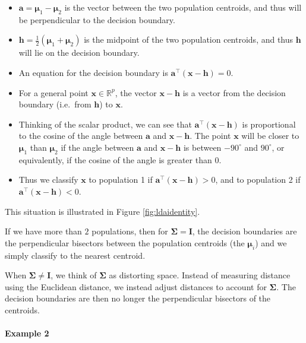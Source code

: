 \documentclass[
]{book}
\theoremstyle{definition}
\theoremstyle{definition}
\theoremstyle{definition}
\theoremstyle{definition}
\theoremstyle{remark}
\begin{document}
\begin{itemize}
\item
  \(\mathbf a= {\boldsymbol{\mu}}_1-{\boldsymbol{\mu}}_2\) is the vector between the two population centroids, and thus will be perpendicular to the decision boundary.
\item
  \(\mathbf h= \frac{1}{2}({\boldsymbol{\mu}}_1+{\boldsymbol{\mu}}_2)\) is the midpoint of the two population centroids, and thus \(\mathbf h\) will lie on the decision boundary.
\item
  An equation for the decision boundary is \(\mathbf a^\top (\mathbf x- \mathbf h)=0\).
\item
  For a general point \(\mathbf x\in \mathbb{R}^p\), the vector \(\mathbf x-\mathbf h\) is a vector from the decision boundary (i.e.~from \(\mathbf h\)) to \(\mathbf x\).
\item
  Thinking of the scalar product, we can see that \(\mathbf a^\top (\mathbf x- \mathbf h)\) is proportional to the cosine of the angle between \(\mathbf a\) and \(\mathbf x-\mathbf h\). The point \(\mathbf x\) will be closer to \({\boldsymbol{\mu}}_1\) than \({\boldsymbol{\mu}}_2\) if the angle between \(\mathbf a\) and \(\mathbf x-\mathbf h\) is between \(-90^\circ\) and \(90^\circ\), or equivalently, if the cosine of the angle is greater than 0.
\item
  Thus we classify \(\mathbf x\) to population 1 if \(\mathbf a^\top (\mathbf x- \mathbf h)>0\), and to population 2 if \(\mathbf a^\top (\mathbf x- \mathbf h)<0\).
\end{itemize}

This situation is illustrated in Figure \ref{fig:ldaidentity}.

If we have more than \(2\) populations, then for \(\boldsymbol{\Sigma}=\mathbf I\), the decision boundaries are the perpendicular bisectors between the population centroids (the \({\boldsymbol{\mu}}_i\)) and we simply classify to the nearest centroid.

When \(\boldsymbol{\Sigma}\not =\mathbf I\), we think of \(\boldsymbol{\Sigma}\) as distorting space. Instead of measuring distance using the Euclidean distance, we instead adjust distances to account for \(\boldsymbol{\Sigma}\). The decision boundaries are then no longer the perpendicular bisectors of the centroids.

\hypertarget{example-2-1}{%
\paragraph*{Example 2}\label{example-2-1}}
\end{document}
